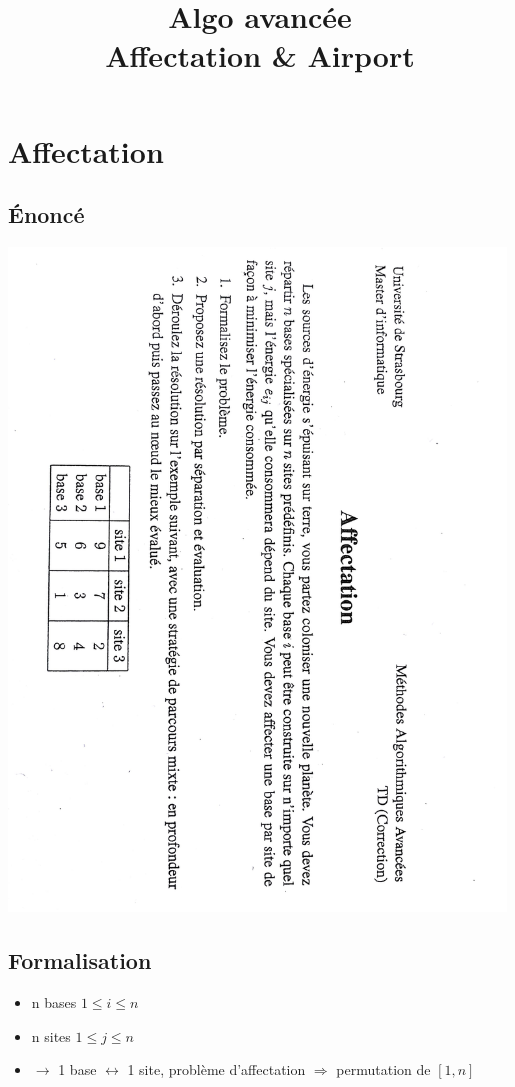 \documentclass[11pt,a4paper]{article}
\title{Algo avancée \\ Affectation \& Airport}
\begin{document}
	\maketitle
	
	\section{Affectation}
	\subsection{Énoncé}
	\includegraphics[angle=90,width=0.99\textwidth]{enonce.jpg}
	\newpage
	\subsection{Formalisation}
	\begin{itemize}
		\item n bases $1 \leqslant i \leqslant n$
		\item n sites $1 \leqslant j \leqslant n$
		\item $\rightarrow$ 1 base $\leftrightarrow$ 1 site, problème d'affectation $\Rightarrow$
 permutation de $[1,n]$
	\end{itemize}
	
\end{document}
